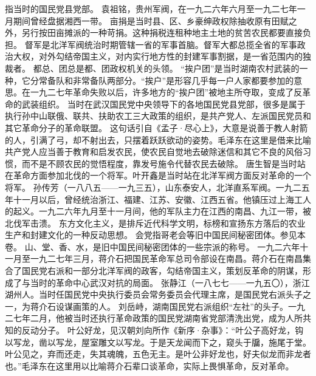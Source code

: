 \begin{maonote}
指当时的国民党县党部。
袁祖铭，贵州军阀，在一九二六年六月至一九二七年一月期间曾经盘据湘西一带。
亩捐是当时县、区、乡豪绅政权除抽收原有田赋之外，另行按田亩摊派的一种苛捐。这种捐税连租种地主土地的贫苦农民都要直接负担。
督军是北洋军阀统治时期管辖一省的军事首脑。督军大都总揽全省的军事政治大权，对外勾结帝国主义，对内实行地方性的封建军事割据，是一省范围内的独裁者。
都总、团总是都、团政权机关的头领。
“挨户团”是当时湖南农村武装的一种，它分常备队和非常备队两部分。“挨户”是形容几乎每一户人家都要参加的意思。在一九二七年革命失败以后，许多地方的“挨户团”被地主所夺取，变成了反革命的武装组织。
当时在武汉国民党中央领导下的各地国民党县党部，很多是属于执行孙中山联俄、联共、扶助农工三大政策的组织，是共产党人、左派国民党员和其它革命分子的革命联盟。
这句话引自《孟子·尽心上》，大意是说善于教人射箭的人，引满了弓，却不射出去，只摆着跃跃欲动的姿势。毛泽东在这里是借来比喻共产党人应当善于教育和启发农民，使农民自觉地去破除迷信和其它不良的风俗习惯，而不是不顾农民的觉悟程度，靠发号施令代替农民去破除。
唐生智是当时站在革命方面参加北伐的一个将军。叶开鑫是当时站在北洋军阀方面反对革命的一个将军。
孙传芳（一八八五——一九三五），山东泰安人，北洋直系军阀。一九二五年十一月以后，曾经统治浙江、福建、江苏、安徽、江西五省。他镇压过上海工人的起义。一九二六年九月至十一月间，他的军队主力在江西的南昌、九江一带，被北伐军击溃。
东方文化主义，是排斥近代科学文明，标榜和宣扬东方落后的农业生产和封建文化的一种反动思想。
会党指哥老会等旧中国民间秘密团体。参见本卷。
山、堂、香、水，是旧中国民间秘密团体的一些宗派的称号。
一九二六年十一月至一九二七年三月，蒋介石把国民革命军总司令部设在南昌。蒋介石在南昌集合了国民党右派和一部分北洋军阀的政客，勾结帝国主义，策划反革命的阴谋，形成了与当时的革命中心武汉对抗的局面。
张静江（一八七七——一九五〇），浙江湖州人。当时任国民党中央执行委员会常务委员会代理主席，是国民党右派头子之一，为蒋介石设谋画策的人。
刘岳峙，湖南国民党右派组织“左社”的头子。一九二七年二月，他被当时还执行革命政策的国民党湖南省党部清洗出党，成为人所共知的反动分子。
叶公好龙，见汉朝刘向所作《新序·杂事》：“叶公子高好龙，钩以写龙，凿以写龙，屋室雕文以写龙。于是天龙闻而下之，窥头于牖，施尾于堂。叶公见之，弃而还走，失其魂魄，五色无主。是叶公非好龙也，好夫似龙而非龙者也。”毛泽东在这里用以比喻蒋介石辈口谈革命，实际上畏惧革命，反对革命。
\end{maonote}
